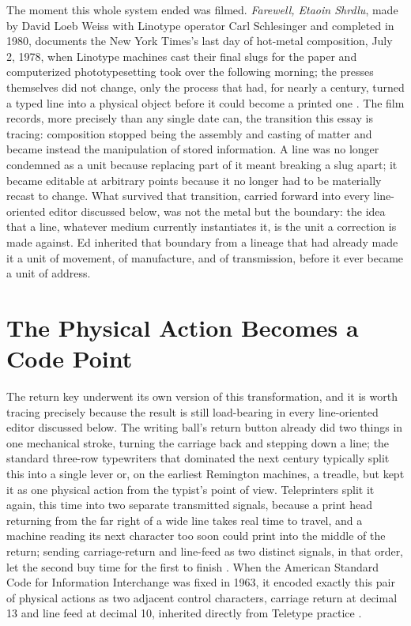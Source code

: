 \documentclass[11pt]{article}
\begin{document}
The moment this whole system ended was filmed. \textit{Farewell, Etaoin Shrdlu}, made by David Loeb Weiss with Linotype operator Carl Schlesinger and completed in 1980, documents the New York Times's last day of hot-metal composition, July 2, 1978, when Linotype machines cast their final slugs for the paper and computerized phototypesetting took over the following morning; the presses themselves did not change, only the process that had, for nearly a century, turned a typed line into a physical object before it could become a printed one \cite{farewelletaoinshrdlu1980}. The film records, more precisely than any single date can, the transition this essay is tracing: composition stopped being the assembly and casting of matter and became instead the manipulation of stored information. A line was no longer condemned as a unit because replacing part of it meant breaking a slug apart; it became editable at arbitrary points because it no longer had to be materially recast to change. What survived that transition, carried forward into every line-oriented editor discussed below, was not the metal but the boundary: the idea that a line, whatever medium currently instantiates it, is the unit a correction is made against. Ed inherited that boundary from a lineage that had already made it a unit of movement, of manufacture, and of transmission, before it ever became a unit of address.

\section{The Physical Action Becomes a Code Point}

The return key underwent its own version of this transformation, and it is worth tracing precisely because the result is still load-bearing in every line-oriented editor discussed below. The writing ball's return button already did two things in one mechanical stroke, turning the carriage back and stepping down a line; the standard three-row typewriters that dominated the next century typically split this into a single lever or, on the earliest Remington machines, a treadle, but kept it as one physical action from the typist's point of view. Teleprinters split it again, this time into two separate transmitted signals, because a print head returning from the far right of a wide line takes real time to travel, and a machine reading its next character too soon could print into the middle of the return; sending carriage-return and line-feed as two distinct signals, in that order, let the second buy time for the first to finish \cite{revk2022}. When the American Standard Code for Information Interchange was fixed in 1963, it encoded exactly this pair of physical actions as two adjacent control characters, carriage return at decimal 13 and line feed at decimal 10, inherited directly from Teletype practice \cite{ascii1963}.
\end{document}
